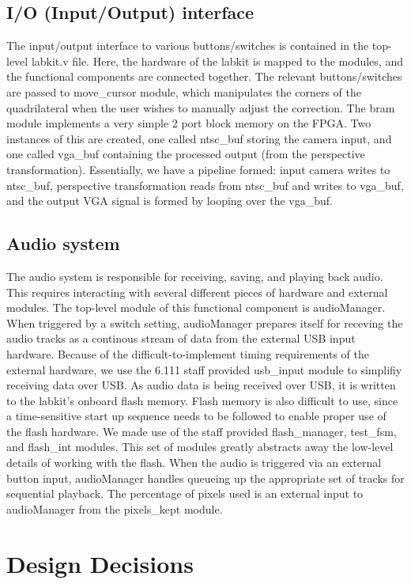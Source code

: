 \documentclass{article}
\begin{document}
\subsection{I/O (Input/Output) interface}
The input/output interface to various buttons/switches is contained in the top-level labkit.v file.
Here, the hardware of the labkit is mapped to the modules, and the functional components are connected together.
The relevant buttons/switches are passed to move\_cursor module, which manipulates the corners of the quadrilateral when the user wishes to manually adjust the correction.
The bram module implements a very simple 2 port block memory on the FPGA.
Two instances of this are created, one called ntsc\_buf storing the camera input, and one called vga\_buf containing the processed output (from the perspective transformation).
Essentially, we have a pipeline formed:
input camera writes to ntsc\_buf, perspective transformation reads from ntsc\_buf and writes to vga\_buf, and the output VGA signal is formed by looping over the vga\_buf.

\subsection{Audio system}
The audio system is responsible for receiving, saving, and playing back audio. 
This requires interacting with several different pieces of hardware and external modules. 
The top-level module of this functional component is audioManager.
When triggered by a switch setting, audioManager prepares itself for receving the audio tracks as a continous stream of data from the external USB input hardware. 
Because of the difficult-to-implement timing requirements of the external hardware, we use the 6.111 staff provided usb\_input module to simplifiy receiving data over USB. 
As audio data is being received over USB, it is written to the labkit's onboard flash memory. 
Flash memory is also difficult to use, since a time-sensitive start up sequence needs to be followed to enable proper use of the flash hardware. 
We made use of the staff provided flash\_manager, test\_fsm, and flash\_int modules. This set of modules greatly abstracts away the low-level details of working with the flash. 
When the audio is triggered via an external button input, audioManager handles queueing up the appropriate set of tracks for sequential playback. The percentage of pixels used is an external input to audioManager from the pixels\_kept module. 

\section{Design Decisions}
\end{document}
